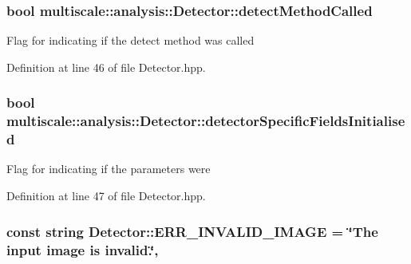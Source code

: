 \hypertarget{classmultiscale_1_1analysis_1_1Detector_ad565f471d9d7db7692da588ff0d6be2f}{
\subsubsection[{detect\-Method\-Called}]{\setlength{\rightskip}{0pt plus 5cm}bool multiscale\-::analysis\-::\-Detector\-::detect\-Method\-Called\hspace{0.3cm}{\ttfamily [protected]}}}\label{classmultiscale_1_1analysis_1_1Detector_ad565f471d9d7db7692da588ff0d6be2f}
Flag for indicating if the detect method was called 

Definition at line 46 of file Detector.\-hpp.

\hypertarget{classmultiscale_1_1analysis_1_1Detector_a172b91067670a14a7707f24dc218f2af}{
\subsubsection[{detector\-Specific\-Fields\-Initialised}]{\setlength{\rightskip}{0pt plus 5cm}bool multiscale\-::analysis\-::\-Detector\-::detector\-Specific\-Fields\-Initialised\hspace{0.3cm}{\ttfamily [protected]}}}\label{classmultiscale_1_1analysis_1_1Detector_a172b91067670a14a7707f24dc218f2af}
Flag for indicating if the parameters were 

Definition at line 47 of file Detector.\-hpp.

\hypertarget{classmultiscale_1_1analysis_1_1Detector_aa5dc8982745f567379e0eccd416c6820}{
\subsubsection[{E\-R\-R\-\_\-\-I\-N\-V\-A\-L\-I\-D\-\_\-\-I\-M\-A\-G\-E}]{\setlength{\rightskip}{0pt plus 5cm}const string Detector\-::\-E\-R\-R\-\_\-\-I\-N\-V\-A\-L\-I\-D\-\_\-\-I\-M\-A\-G\-E = \char`\"{}The input {\bf image} is invalid.\char`\"{}\hspace{0.3cm}{\ttfamily [static]}, {\ttfamily [protected]}}}\label{classmultiscale_1_1analysis_1_1Detector_aa5dc8982745f567379e0eccd416c6820}


